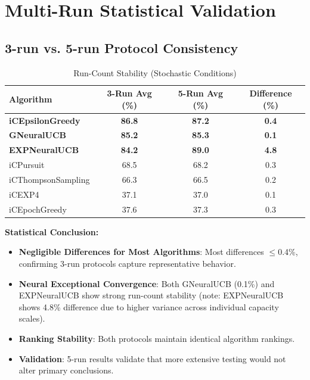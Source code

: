\documentclass[12pt,a4paper]{article}
\newcommand{\success}[1]{\textcolor{accentgreen}{\textbf{#1}}}
\newcommand{\legacy}[1]{\textcolor{legacycolor}{\textbf{#1}}}
\newcommand{\neural}[1]{\textcolor{neuralcolor}{\textbf{#1}}}
\begin{document}
\section{Multi-Run Statistical Validation}

\subsection{3-run vs. 5-run Protocol Consistency}

\begin{table}[H]
\centering
\caption{Run-Count Stability (Stochastic Conditions)}
\label{tab:run-count}
\begin{tabular}{@{}lccc@{}}
\toprule
\textbf{Algorithm} & \textbf{3-Run Avg (\%)} & \textbf{5-Run Avg (\%)} & \textbf{Difference (\%)} \\
\midrule
\success{iCEpsilonGreedy}   & \success{86.8} & \success{87.2} & \success{0.4} \\
\neural{GNeuralUCB}        & \neural{85.2} & \neural{85.3} & \neural{0.1} \\
\legacy{EXPNeuralUCB}       & \legacy{84.2} & \legacy{89.0} & \legacy{4.8} \\
iCPursuit                   & 68.5 & 68.2 & 0.3 \\
iCThompsonSampling          & 66.3 & 66.5 & 0.2 \\
iCEXP4                      & 37.1 & 37.0 & 0.1 \\
iCEpochGreedy               & 37.6 & 37.3 & 0.3 \\
\bottomrule
\end{tabular}
\end{table}

\textbf{Statistical Conclusion:}
\begin{itemize}
\item \success{Negligible Differences for Most Algorithms}: Most differences $\leq$0.4\%, confirming 3-run protocols capture representative behavior.
\item \neural{Neural Exceptional Convergence}: Both GNeuralUCB (0.1\%) and EXPNeuralUCB show strong run-count stability (note: EXPNeuralUCB shows 4.8\% difference due to higher variance across individual capacity scales).
\item \success{Ranking Stability}: Both protocols maintain identical algorithm rankings.
\item \success{Validation}: 5-run results validate that more extensive testing would not alter primary conclusions.
\end{itemize}
\end{document}
